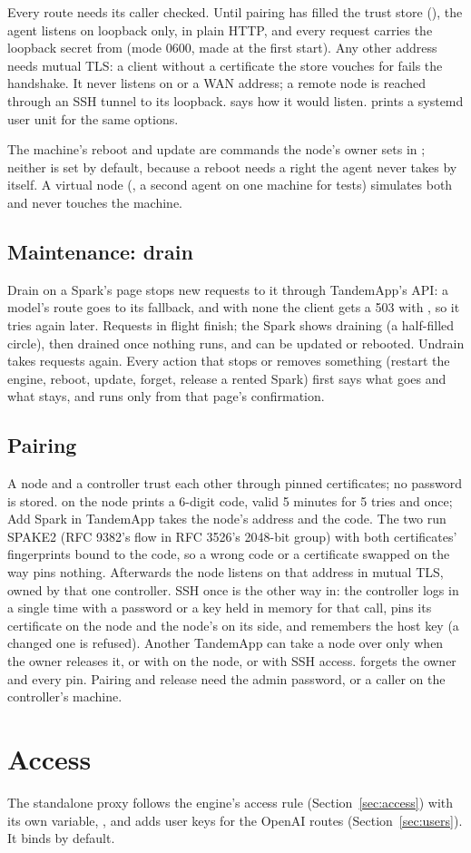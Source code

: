 Every route needs its caller checked. Until pairing has filled the trust store (), the agent listens on loopback only, in plain HTTP, and every request carries the loopback secret from  (mode 0600, made at the first start). Any other address needs mutual TLS: a client without a certificate the store vouches for fails the handshake. It never listens on  or a WAN address; a remote node is reached through an SSH tunnel to its loopback.  says how it would listen.  prints a systemd user unit for the same options.

The machine's reboot and update are commands the node's owner sets in ; neither is set by default, because a reboot needs a right the agent never takes by itself. A virtual node (, a second agent on one machine for tests) simulates both and never touches the machine.

\subsection{Maintenance: drain}

Drain on a Spark's page stops new requests to it through TandemApp's API: a model's route goes to its fallback, and with none the client gets a 503 with , so it tries again later. Requests in flight finish; the Spark shows draining (a half-filled circle), then drained once nothing runs, and can be updated or rebooted. Undrain takes requests again. Every action that stops or removes something (restart the engine, reboot, update, forget, release a rented Spark) first says what goes and what stays, and runs only from that page's confirmation.

\subsection{Pairing}

A node and a controller trust each other through pinned certificates; no password is stored.  on the node prints a 6-digit code, valid 5 minutes for 5 tries and once; Add Spark in TandemApp takes the node's address and the code. The two run SPAKE2 (RFC 9382's flow in RFC 3526's 2048-bit group) with both certificates' fingerprints bound to the code, so a wrong code or a certificate swapped on the way pins nothing. Afterwards the node listens on that address in mutual TLS, owned by that one controller. SSH once is the other way in: the controller logs in a single time with a password or a key held in memory for that call, pins its certificate on the node and the node's on its side, and remembers the host key (a changed one is refused). Another TandemApp can take a node over only when the owner releases it, or with  on the node, or with SSH access.  forgets the owner and every pin. Pairing and release need the admin password, or a caller on the controller's machine.

\section{Access}

The standalone proxy follows the engine's access rule (Section~\ref{sec:access}) with its own variable, , and adds user keys for the OpenAI routes (Section~\ref{sec:users}). It binds  by default.
